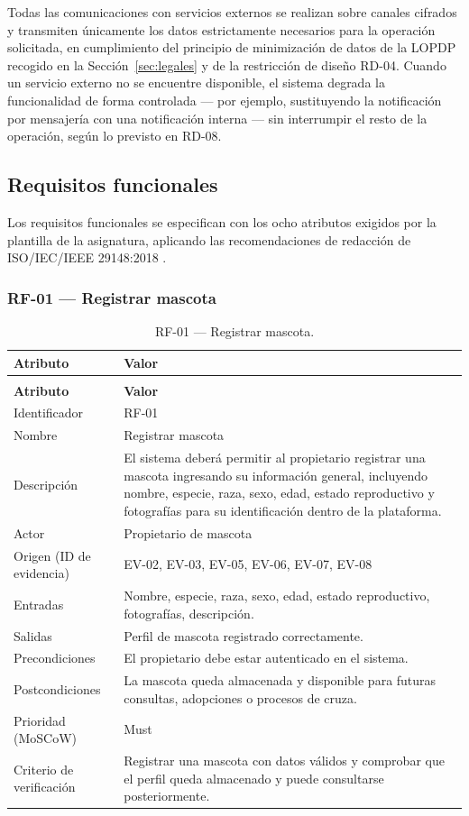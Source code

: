 \documentclass[journal,onecolumn]{IEEEtran}
\makeatletter
\newenvironment{atributos}[2]{%
	\small
	\begin{longtable}{@{}>{\raggedright\arraybackslash}p{4.2cm} >{\raggedright\arraybackslash}p{11.2cm}@{}}
		\caption{#2}\label{tab:#1}\\
		\toprule
		\textbf{Atributo} & \textbf{Valor} \\
		\midrule
		\endfirsthead
		\multicolumn{2}{@{}l}{\small\itshape (continuación)}\\
		\toprule
		\textbf{Atributo} & \textbf{Valor} \\
		\midrule
		\endhead
		\bottomrule
		\endlastfoot
	}{%
	\end{longtable}
	\normalsize
}
\makeatother
\begin{document}
	Todas las comunicaciones con servicios externos se realizan sobre canales
	cifrados y transmiten únicamente los datos estrictamente necesarios para la
	operación solicitada, en cumplimiento del principio de minimización de datos
	de la LOPDP recogido en la Sección~\ref{sec:legales} y de la restricción de
	diseño RD-04. Cuando un servicio externo no se encuentre disponible, el
	sistema degrada la funcionalidad de forma controlada --- por ejemplo,
	sustituyendo la notificación por mensajería con una notificación interna ---
	sin interrumpir el resto de la operación, según lo previsto en RD-08.
	
	\subsection{Requisitos funcionales}
	\label{sec:rf}
	
	Los requisitos funcionales se especifican con los ocho atributos exigidos por la
	plantilla de la asignatura, aplicando las recomendaciones de redacción de
	ISO/IEC/IEEE 29148:2018 \cite{iso29148}.
	
	\subsubsection{RF-01 --- Registrar mascota}
	
	\begin{atributos}{RF-01}{RF-01 --- Registrar mascota.}
		Identificador & RF-01 \\
		Nombre & Registrar mascota \\
		Descripción & El sistema deberá permitir al propietario registrar una mascota ingresando su información general, incluyendo nombre, especie, raza, sexo, edad, estado reproductivo y fotografías para su identificación dentro de la plataforma. \\
		Actor & Propietario de mascota \\
		Origen (ID de evidencia) & EV-02, EV-03, EV-05, EV-06, EV-07, EV-08 \\
		Entradas & Nombre, especie, raza, sexo, edad, estado reproductivo, fotografías, descripción. \\
		Salidas & Perfil de mascota registrado correctamente. \\
		Precondiciones & El propietario debe estar autenticado en el sistema. \\
		Postcondiciones & La mascota queda almacenada y disponible para futuras consultas, adopciones o procesos de cruza. \\
		Prioridad (MoSCoW) & Must \\
		Criterio de verificación & Registrar una mascota con datos válidos y comprobar que el perfil queda almacenado y puede consultarse posteriormente. \\
	\end{atributos}
	
\end{document}
